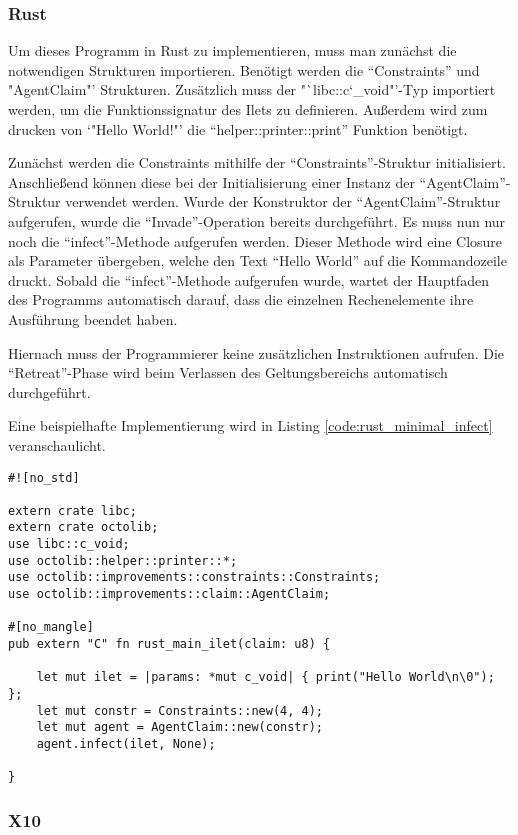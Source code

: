 \subsubsection{Rust}

Um dieses Programm in Rust zu implementieren, muss man zunächst die notwendigen Strukturen importieren.
Benötigt werden die "`Constraints"' und "AgentClaim"' Strukturen. 
Zusätzlich muss der "`libc::c\char`_void"'-Typ importiert werden, um die Funktionssignatur des Ilets zu definieren.
Außerdem wird zum drucken von `"Hello World!"' die "`helper::printer::print"' Funktion benötigt.

Zunächst werden die Constraints mithilfe der "`Constraints"'-Struktur initialisiert. Anschließend können diese
bei der Initialisierung einer Instanz der "`AgentClaim"'-Struktur verwendet werden. Wurde der Konstruktor
der "`AgentClaim"'-Struktur aufgerufen, wurde die "`Invade"'-Operation bereits durchgeführt. Es muss nun nur noch
die "`infect"'-Methode aufgerufen werden. Dieser Methode wird eine Closure als Parameter übergeben, welche den
Text "`Hello World"' auf die Kommandozeile druckt. Sobald die "`infect"'-Methode aufgerufen wurde, wartet der
Hauptfaden des Programms automatisch darauf, dass die einzelnen Rechenelemente ihre Ausführung beendet haben.

Hiernach muss der Programmierer keine zusätzlichen Instruktionen aufrufen. Die "`Retreat"'-Phase wird beim
Verlassen des Geltungsbereichs automatisch durchgeführt.

Eine beispielhafte Implementierung wird in Listing \ref{code:rust_minimal_infect} veranschaulicht.

\begin{lstlisting}[float,caption={Minimales Invade, Infect, Retreat in Rust},label=code:rust_minimal_infect]
#![no_std]

extern crate libc;
extern crate octolib;
use libc::c_void;
use octolib::helper::printer::*;
use octolib::improvements::constraints::Constraints;
use octolib::improvements::claim::AgentClaim;

#[no_mangle]
pub extern "C" fn rust_main_ilet(claim: u8) {

    let mut ilet = |params: *mut c_void| { print("Hello World\n\0"); };
    let mut constr = Constraints::new(4, 4);
    let mut agent = AgentClaim::new(constr);
    agent.infect(ilet, None);

}
\end{lstlisting}

\subsubsection{X10}

